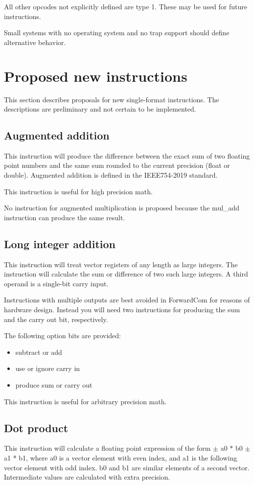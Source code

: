 \documentclass[forwardcom.tex]{subfiles}
\begin{document}
All other opcodes not explicitly defined are type 1. These may be used for future instructions.
\vv

Small systems with no operating system and no trap support should define alternative behavior.
\vv

\section{Proposed new instructions}
This section describes proposals for new single-format instructions. The descriptions are preliminary and not certain to be implemented.
\vv

\subsection{Augmented addition}
This instruction will produce the difference between the exact sum of two floating point numbers and the same sum rounded to the current precision (float or double). Augmented addition is defined in the IEEE754-2019 standard.
\vv

This instruction is useful for high precision math.
\vv

No instruction for augmented multiplication is proposed because the mul\_add instruction can produce the same result.
\vv

\subsection{Long integer addition}
This instruction will treat vector registers of any length as large integers. The instruction will calculate the sum or difference of two such large integers. A third operand is a single-bit carry input.
\vv

Instructions with multiple outputs are best avoided in ForwardCom for reasons of hardware design. Instead you will need two instructions for producing the sum and the carry out bit, respectively. 
\vv

The following option bits are provided:
\begin{itemize}
\item subtract or add
\item use or ignore carry in
\item produce sum or carry out
\end{itemize}
\vv

This instruction is useful for arbitrary precision math.
\vv

\subsection{Dot product}
This instruction will calculate a floating point expression of the form $\pm$ a0 $*$ b0 $\pm$ a1 * b1, where a0 is a vector element with even index, and a1 is the following vector element with odd index. b0 and b1 are similar elements of a second vector. Intermediate values are calculated with extra precision.
\vv
\end{document}
